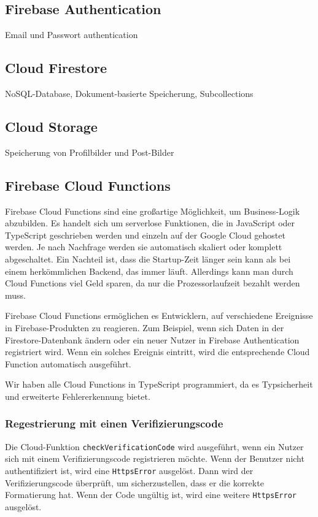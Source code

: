 \subsection{Firebase Authentication}
Email und Passwort authentication

\subsection{Cloud Firestore}
NoSQL-Database, Dokument-basierte Speicherung, Subcollections
\subsection{Cloud Storage}
Speicherung von Profilbilder und Post-Bilder
\subsection{Firebase Cloud Functions}
Firebase Cloud Functions sind eine großartige Möglichkeit,
um Business-Logik abzubilden. Es handelt sich um serverlose
Funktionen, die in JavaScript oder TypeScript geschrieben
werden und einzeln auf der Google Cloud gehostet werden. Je
nach Nachfrage werden sie automatisch skaliert oder komplett
abgeschaltet. Ein Nachteil ist, dass die Startup-Zeit länger
sein kann als bei einem herkömmlichen Backend, das immer
läuft. Allerdings kann man durch Cloud Functions viel Geld
sparen, da nur die Prozessorlaufzeit bezahlt werden muss.

Firebase Cloud Functions ermöglichen es Entwicklern, auf verschiedene Ereignisse in Firebase-Produkten zu reagieren. Zum Beispiel, wenn sich Daten in der Firestore-Datenbank ändern oder ein neuer Nutzer in Firebase Authentication registriert wird. Wenn ein solches Ereignis eintritt, wird die entsprechende Cloud Function automatisch ausgeführt.

Wir haben alle Cloud Functions in TypeScript programmiert,
da es Typsicherheit und erweiterte Fehlererkennung
bietet.


\subsubsection{Regestrierung mit einen Verifizierungscode}

Die Cloud-Funktion \texttt{checkVerificationCode} wird ausgeführt, wenn ein Nutzer sich mit einem Verifizierungscode registrieren möchte. Wenn der Benutzer nicht authentifiziert ist, wird eine \texttt{HttpsError} ausgelöst. Dann wird der Verifizierungscode überprüft, um sicherzustellen, dass er die korrekte Formatierung hat. Wenn der Code ungültig ist, wird eine weitere \texttt{HttpsError} ausgelöst.


